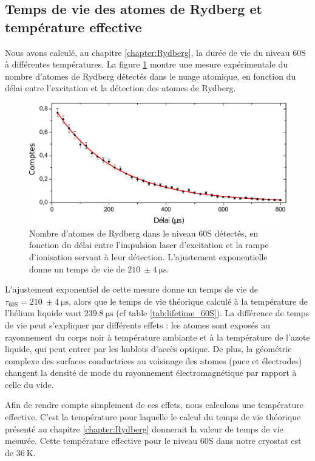 \subsection{Temps de vie des atomes de Rydberg et température effective}\label{subsec:lifetime}
\noindent Nous avons calculé, au chapitre \ref{chapter:Rydberg}, la durée de vie du niveau $\mathrm{60S}$ à différentes températures.
La figure \ref{fig:lifetime_60S} montre une mesure expérimentale du nombre d'atomes de Rydberg détectés dans le nuage atomique, en fonction du délai entre l'excitation et la détection des atomes de Rydberg.
%
\begin{figure}[h]
\centering
\includegraphics[width=0.8\linewidth]{figures/setup/rydberg/lifetime_60S}
\caption[Durée de vie du niveau 60S]{
Nombre d'atomes de Rydberg dans le niveau $\mathrm{60S}$ détectés, en fonction du délai entre l'impulsion laser d'excitation et la rampe d'ionisation servant à leur détection.
L'ajustement exponentielle donne un temps de vie de $\SI{210}{} \pm \SI{4}{\us}$.
}
\label{fig:lifetime_60S}
\end{figure}
%
L'ajustement exponentiel de cette mesure donne un temps de vie de $\tau_{\mathrm{60S}} = \SI{210}{} \pm \SI{4}{\us}$, alors que le temps de vie théorique calculé à la température de l'hélium liquide vaut $\SI{239.8}{\us}$ (cf table \ref{tab:lifetime_60S}).
La différence de temps de vie peut s'expliquer par différents effets :
les atomes sont exposés au rayonnement du corps noir à température ambiante et à la température de l'azote liquide, qui peut entrer par les hublots d'accès optique.
De plus, la géométrie complexe des surfaces conductrices au voisinage des atomes (puce et électrodes) changent la densité de mode du rayonnement électromagnétique par rapport à celle du vide.

Afin de rendre compte simplement de ces effets, nous calculons une température effective.
C'est la température pour laquelle le calcul du temps de vie théorique présenté au chapitre \ref{chapter:Rydberg} donnerait la valeur de temps de vie mesurée.
Cette température effective pour le niveau $\mathrm{60S}$ dans notre cryostat est de $\SI{36}{\kelvin}$.


